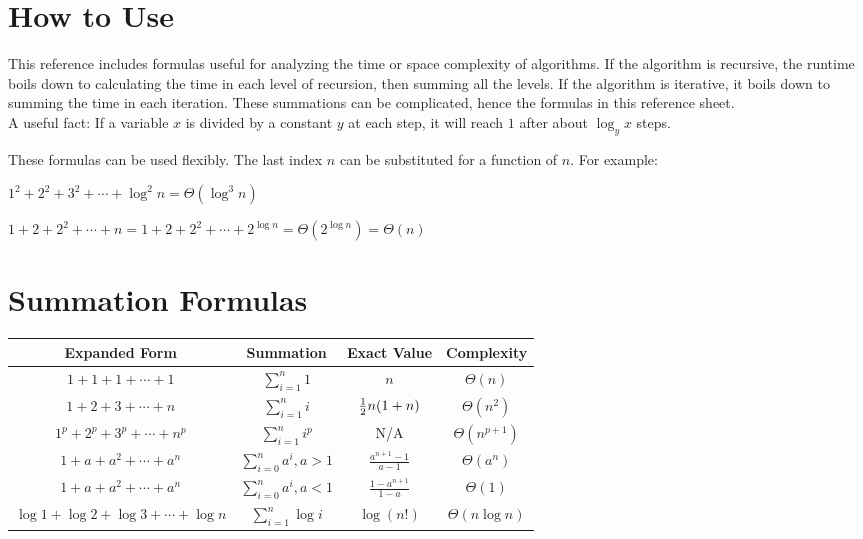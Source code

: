 \documentclass[12pt]{article}
\date{February 2020} %
\begin{document}
\section{How to Use}

    This reference includes formulas useful for analyzing the time or space
    complexity of algorithms. If the algorithm is recursive, the runtime boils down
    to calculating the time in each level of recursion, then summing all the levels.
    If the algorithm is iterative, it boils down to summing the time in each
    iteration. These summations can be complicated, hence the formulas in this
    reference sheet. \\
    
    A useful fact: If a variable $x$ is divided by a constant $y$ at each step, it
    will reach $1$ after about $\log_y x$ steps.
    
    These formulas can be used flexibly. The last index $n$ can be substituted for
    a function of $n$. For example:
    
    $1^2+2^2+3^2+\cdots+\log^2n=\Theta(\log^3n)$
    
    $1+2+2^2+\cdots+n=1+2+2^2+\cdots+2^{\log n}=\Theta(2^{\log n})=\Theta(n)$
    
\section{Summation Formulas}

\noindent
\begin{tabular}{cc|cc}
    Expanded Form & Summation & Exact Value & Complexity \\
    \hline
    $1+1+1+\cdots+1$ & $\displaystyle\sum_{i=1}^n 1$ & $n$ & $\Theta(n)$ \\
    $1+2+3+\cdots+n$ & $\displaystyle\sum_{i=1}^n i$ & $\frac{1}{2} n(1+n)$ & $\Theta(n^2)$ \\
    $1^p+2^p+3^p+\cdots+n^p$ & $\displaystyle\sum_{i=1}^n i^p$ & N/A & $\Theta(n^{p+1})$ \\
    $1+a+a^2+\cdots+a^n$ & $\displaystyle\sum_{i=0}^n a^i, a>1$ & $\displaystyle\frac{a^{n+1}-1}{a-1}$ & $\Theta(a^n)$ \\
    $1+a+a^2+\cdots+a^n$ & $\displaystyle\sum_{i=0}^n a^i, a<1$ & $\displaystyle\frac{1-a^{n+1}}{1-a}$ & $\Theta(1)$ \\
    $\log1+\log2+\log3+\cdots+\log n$ & $\displaystyle\sum_{i=1}^n \log i$ & $\log(n!)$ & $\Theta(n\log n)$
\end{tabular}
\end{document}
